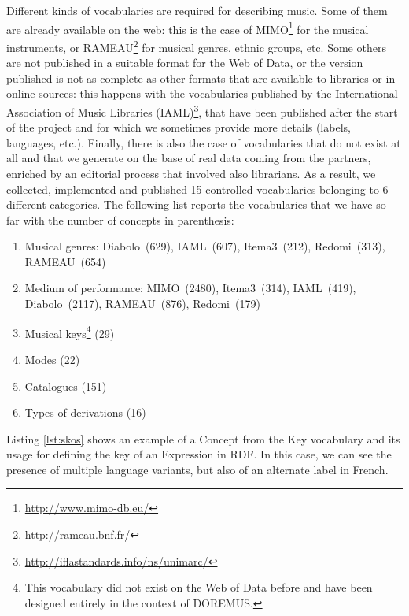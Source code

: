 Different kinds of vocabularies are required for describing music.
Some of them are already available on the web: this is the case of MIMO\footnote{\url{http://www.mimo-db.eu/}} for the musical instruments, or RAMEAU\footnote{\url{http://rameau.bnf.fr/}} for musical genres, ethnic groups, etc. Some others are not published in a suitable format for the Web of Data, or the version published is not as complete as other formats that are available to libraries or in online sources: this happens with the vocabularies published by the International Association of Music Libraries (IAML)\footnote{\url{http://iflastandards.info/ns/unimarc/}}, that have been published after the start of the project and for which we sometimes provide more details (labels, languages, etc.). Finally, there is also the case of vocabularies that do not exist at all and that we generate on the base of real data coming from the partners, enriched by an editorial process that involved also librarians. As a result, we collected, implemented and published 15 controlled vocabularies belonging to 6 different categories. The following list reports the vocabularies that we have so far with the number of concepts in parenthesis:
\begin{enumerate}
 \item{Musical genres: Diabolo~(629), IAML~(607), Itema3~(212), Redomi~(313), RAMEAU~(654)}
 \item{Medium of performance: MIMO~(2480), Itema3~(314), IAML~(419), Diabolo~(2117), RAMEAU~(876), Redomi~(179) }
 \item{Musical keys\footnote{\label{newvoc}This vocabulary did not exist on the Web of Data before and have been designed entirely in the context of DOREMUS.} (29)}
 \item{Modes (22)}
 \item{Catalogues (151)}
 \item{Types of derivations (16)}
\end{enumerate}

Listing \ref{lst:skos} shows an example of a Concept from the Key vocabulary and its usage for defining the key of an Expression in RDF. In this case, we can see the presence of multiple language variants, but also of an alternate label in French.

